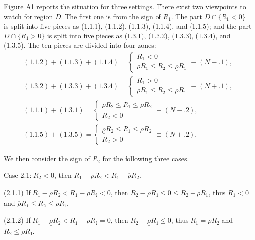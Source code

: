 \documentclass[10pt]{article}
\begin{document}
Figure A1 reports the situation for three settings. There exist two viewpoints to watch for region $D$. The first one is from the sign of $ R_1 $. The part $ D \cap \{ R_1 < 0 \} $ is split into five pieces as (1.1.1), (1.1.2), (1.1.3), (1.1.4), and (1.1.5); and the part $ D \cap \{ R_1 > 0 \} $ is split into five pieces as (1.3.1), (1.3.2), (1.3.3), (1.3.4), and (1.3.5). The ten pieces are divided into four zones:
\begin{eqnarray*}
& (1.1.2) + (1.1.3) + (1.1.4) = \left\{ \begin{matrix} R_1 < 0 \\ \overline{\rho} R_1 \leqslant R_2 \leqslant \underline{\rho} R_1 \end{matrix} \right. \equiv (N-.1), & \\
& (1.3.2) + (1.3.3) + (1.3.4) = \left\{ \begin{matrix} R_1 > 0 \\ \underline{\rho} R_1 \leqslant R_2 \leqslant \overline{\rho} R_1 \end{matrix} \right. \equiv (N+.1), & \\
& (1.1.1) + (1.3.1) = \left\{ \begin{matrix} \overline{\rho} R_2 \leqslant R_1 \leqslant \underline{\rho} R_2 \\ R_2 < 0 \end{matrix} \right. \equiv (N-.2), & \\
& (1.1.5) + (1.3.5) = \left\{ \begin{matrix} \underline{\rho} R_2 \leqslant R_1 \leqslant \overline{\rho} R_2 \\ R_2 > 0 \end{matrix} \right. \equiv (N+.2). &
\end{eqnarray*}

We then consider the sign of $ R_2 $ for the following three cases.

Case 2.1: $ R_2 < 0 $, then $ R_1 - \underline{\rho} R_2 < R_1 - \overline{\rho} R_2 $.

(2.1.1) If $ R_1 - \underline{\rho} R_2 < R_1 - \overline{\rho} R_2 < 0 $, then $ R_2 - \underline{\rho} R_1 \leqslant 0 \leqslant R_2 - \overline{\rho} R_1 $, thus $ R_1 < 0 $ and $ \overline{\rho} R_1 \leqslant R_2 \leqslant \underline{\rho} R_1 $. 

(2.1.2) If $ R_1 - \underline{\rho} R_2 < R_1 - \overline{\rho} R_2 = 0 $, then $ R_2 - \underline{\rho} R_1 \leqslant 0 $, thus $ R_1 = \overline{\rho} R_2 $ and $ R_2 \leqslant \underline{\rho} R_1 $.
\end{document}
